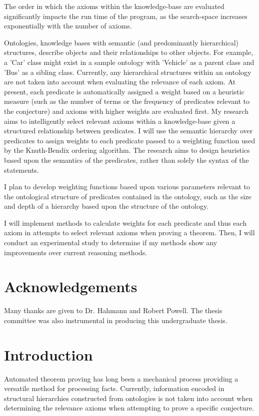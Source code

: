 \documentclass{article}
\begin{document}
The order in which the axioms within the knowledge-base are evaluated significantly impacts the run time of the program, as the search-space increases exponentially with the number of axioms. 

Ontologies, knowledge bases with semantic (and predominantly hierarchical) structures, describe objects and their relationships to other objects. For example, a 'Car' class might exist in a sample ontology with 'Vehicle' as a parent class and 'Bus' as a sibling class. Currently, any hierarchical structures within an ontology are not taken into account when evaluating the relevance of each axiom. At present, each predicate is automatically assigned a weight based on a heuristic measure (such as the number of terms or the frequency of predicates relevant to the conjecture) and axioms with higher weights are evaluated first. My research aims to intelligently select relevant axioms within a knowledge-base given a structured relationship between predicates. I will use the semantic hierarchy over predicates to assign weights to each predicate passed to a weighting function used by the Knuth-Bendix ordering algorithm. The research aims to design heuristics based upon the semantics of the predicates, rather than solely the syntax of the statements. 

I plan to develop weighting functions based upon various parameters relevant to the ontological structure of predicates contained in the ontology, such as the size and depth of a hierarchy based upon the structure of the ontology. 

I will implement methods to calculate weights for each predicate and thus each axiom in attempts to select relevant axioms when proving a theorem. Then, I will conduct an experimental study to determine if my methods show any improvements over current reasoning methods. 
\newpage
\section{Acknowledgements}
Many thanks are given to Dr. Hahmann and Robert Powell. The thesis committee was also instrumental in producing this undergraduate thesis.
\newpage
\section{Introduction}
Automated theorem proving has long been a mechanical process providing a versatile method for processing facts. Currently, information encoded in structural hierarchies constructed from ontologies is not taken into account when determining the relevance axioms when attempting to prove a specific conjecture. 
\end{document}
